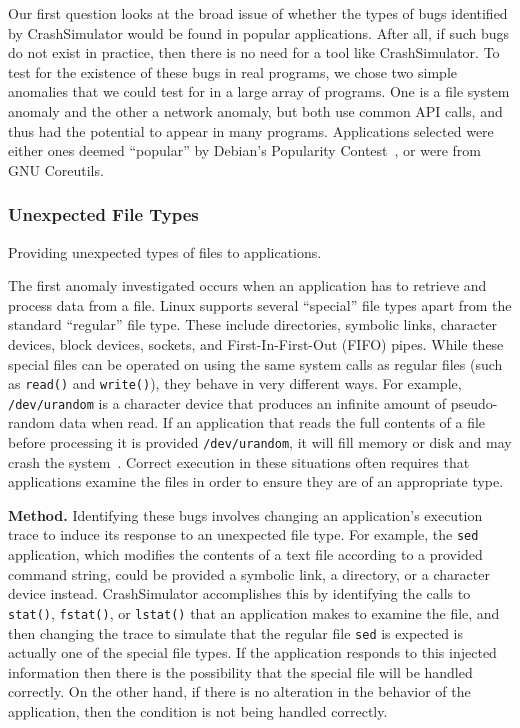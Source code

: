 
Our first question looks at the broad issue of whether the types of bugs
identified by 
CrashSimulator would be found in popular applications.
After all, if such bugs
do not exist in practice, then there is no need for a tool like CrashSimulator.
To test for the existence of these bugs in real programs, we 
chose two simple anomalies that we could test for in a large
array of programs.  One is a file system anomaly and the other a network anomaly,
but both use common API calls, and thus had the potential to appear in
many programs.  Applications selected were either ones deemed ``popular'' by
Debian's Popularity Contest~\cite{DebPopCon}, or were from GNU Coreutils.

\subsubsection{Unexpected File Types} 
\label{sec-file-type-bugs}
Providing unexpected types of files to
applications.

The first anomaly investigated occurs when an
application has to retrieve and process data from a file.  Linux supports
several ``special'' file types apart from the standard ``regular'' file type.
These include directories, symbolic links, character devices, block devices,
sockets, and First-In-First-Out (FIFO) pipes.  While these special files can
be operated on using the same system calls as regular files 
(such as {\tt read()} and {\tt write()}), they behave in very different
ways.  For example, {\tt /dev/urandom} is a character device that produces
an infinite amount of pseudo-random data when read.
If an application that reads the full contents of a file
before processing it is provided {\tt /dev/urandom}, it will fill memory
or disk and may crash the system~\cite{YumAptEndless}.
Correct execution in these situations
often requires that applications 
examine the files in order to ensure they are of an appropriate type.

{\bf Method.}  Identifying these bugs involves changing an application's
execution trace to induce its response to an unexpected file type. 
For example, the {\tt sed} application, which modifies the contents
of a text file according to a provided command string, could be provided
a symbolic link, a directory, or a character device
instead.  CrashSimulator accomplishes this by identifying the calls to {\tt
  stat()}, {\tt fstat()}, or {\tt lstat()} that an application makes to examine
the file, and then changing the trace to simulate that the regular file {\tt sed}
is expected is actually one of the special file types.  If the application
responds to this injected information then there is the possibility that the
special file will be handled correctly.  On the other hand, if there is no
alteration in the behavior of the application,  
then the condition is not being handled correctly.


